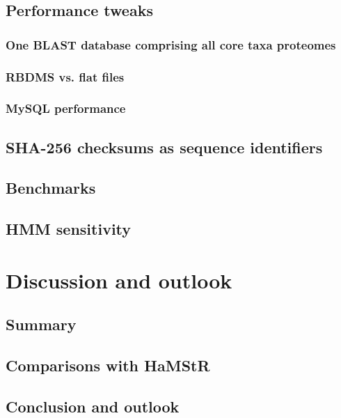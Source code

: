 \documentclass[a4paper,12.5pt]{scrreprt}
\newcommand{\hamstr}{HaMStR\xspace}
\begin{document}
	\section{Performance tweaks}
		\subsection{One BLAST database comprising all core taxa proteomes}
			
		\subsection{RBDMS vs. flat files}
		\subsection{MySQL performance}
	\section{SHA-256 checksums as sequence identifiers}
		
	\section{Benchmarks}
	\section{HMM sensitivity}
		

\chapter{Discussion and outlook}
	
	\section{Summary}
	\section{Comparisons with \hamstr}
	\clearpage
	\section{Conclusion and outlook}
	\clearpage

{}


\clearpage
\end{document}
